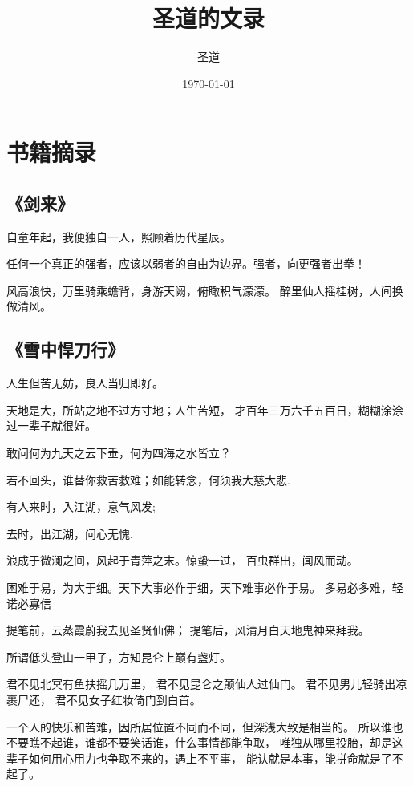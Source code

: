 \documentclass[UTF8,oneside]{ctexbook}
\title{圣道的文录}
\author{圣道}
\date{\today}
\begin{document}
\maketitle
\let\kaishu\relax
\tableofcontents

\chapter{书籍摘录}
\section{《剑来》}
\mfApache \quad 自童年起，我便独自一人，照顾着历代星辰。

\mfApache \quad 任何一个真正的强者，应该以弱者的自由为边界。强者，向更强者出拳！

\mfApache \quad 风高浪快，万里骑乘蟾背，身游天阙，俯瞰积气濛濛。
醉里仙人摇桂树，人间换做清风。

\newpage
\section{《雪中悍刀行》}
\mfApache \quad 人生但苦无妨，良人当归即好。

\mfApache \quad 天地是大，所站之地不过方寸地；人生苦短，
                才百年三万六千五百日，糊糊涂涂过一辈子就很好。

\mfApache \quad 敢问何为九天之云下垂，何为四海之水皆立？

\mfApache \quad 若不回头，谁替你救苦救难；如能转念，何须我大慈大悲.

\mfApache \quad 有人来时，入江湖，意气风发;
\par \quad \quad 去时，出江湖，问心无愧.

\mfApache \quad 浪成于微澜之间，风起于青萍之末。惊蛰一过，
                百虫群出，闻风而动。

\mfApache \quad 困难于易，为大于细。天下大事必作于细，天下难事必作于易。
                多易必多难，轻诺必寡信

\mfApache \quad 提笔前，云蒸霞蔚我去见圣贤仙佛；
提笔后，风清月白天地鬼神来拜我。

\mfApache \quad 所谓低头登山一甲子，方知昆仑上巅有盏灯。

\mfApache \quad 君不见北冥有鱼扶摇几万里，
君不见昆仑之颠仙人过仙门。
君不见男儿轻骑出凉裹尸还，
君不见女子红妆倚门到白首。

\mfApache \quad 一个人的快乐和苦难，因所居位置不同而不同，但深浅大致是相当的。
所以谁也不要瞧不起谁，谁都不要笑话谁，什么事情都能争取，
唯独从哪里投胎，却是这辈子如何用心用力也争取不来的，遇上不平事，
能认就是本事，能拼命就是了不起了。
\end{document}
